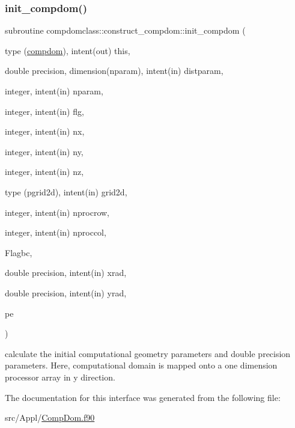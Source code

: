 \subsubsection{\texorpdfstring{init\_compdom()}{init\_compdom()}}
{\footnotesize\ttfamily subroutine compdomclass\+::construct\+\_\+compdom\+::init\+\_\+compdom (\begin{DoxyParamCaption}\item[{type (\mbox{\hyperlink{namespacecompdomclass_structcompdomclass_1_1compdom}{compdom}}), intent(out)}]{this,  }\item[{double precision, dimension(nparam), intent(in)}]{distparam,  }\item[{integer, intent(in)}]{nparam,  }\item[{integer, intent(in)}]{flg,  }\item[{integer, intent(in)}]{nx,  }\item[{integer, intent(in)}]{ny,  }\item[{integer, intent(in)}]{nz,  }\item[{type (pgrid2d), intent(in)}]{grid2d,  }\item[{integer, intent(in)}]{nprocrow,  }\item[{integer, intent(in)}]{nproccol,  }\item[{}]{Flagbc,  }\item[{double precision, intent(in)}]{xrad,  }\item[{double precision, intent(in)}]{yrad,  }\item[{}]{pe }\end{DoxyParamCaption})}



calculate the initial computational geometry parameters and double precision parameters. Here, computational domain is mapped onto a one dimension processor array in y direction. 



The documentation for this interface was generated from the following file\+:\begin{DoxyCompactItemize}
\item 
src/\+Appl/\mbox{\hyperlink{_comp_dom_8f90}{Comp\+Dom.\+f90}}\end{DoxyCompactItemize}
